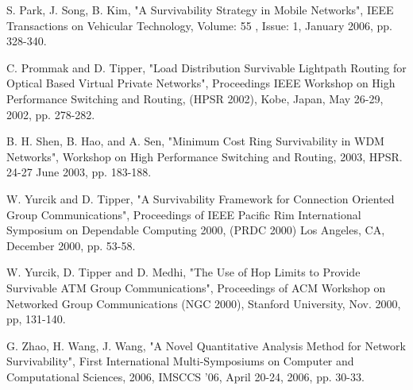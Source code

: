 \documentclass[onecolumn,conference]{IEEEtran}
\begin{document}
\begin{thebibliography}{00}
         S. Park, J. Song, B. Kim, "A Survivability Strategy in Mobile Networks", IEEE Transactions on Vehicular Technology, Volume: 55 , Issue: 1, January 2006, pp. 328-340.

         C. Prommak and D. Tipper, "Load Distribution Survivable Lightpath Routing for Optical Based Virtual Private Networks", Proceedings IEEE Workshop on High Performance Switching and Routing, (HPSR 2002), Kobe, Japan, May 26-29, 2002, pp. 278-282.

         B. H. Shen, B. Hao, and A. Sen, "Minimum Cost Ring Survivability in WDM Networks", Workshop on High Performance Switching and Routing, 2003, HPSR. 24-27 June 2003, pp. 183-188.

         W. Yurcik and D. Tipper, "A Survivability Framework for Connection Oriented Group Communications", Proceedings of IEEE Pacific Rim International Symposium on Dependable Computing 2000, (PRDC 2000) Los Angeles, CA, December 2000, pp. 53-58.

         W. Yurcik, D. Tipper and D. Medhi, "The Use of Hop Limits to Provide Survivable ATM Group Communications", Proceedings of ACM Workshop on Networked Group Communications (NGC 2000), Stanford University, Nov. 2000, pp, 131-140.

         G. Zhao, H. Wang, J. Wang, "A Novel Quantitative Analysis Method for Network Survivability", First International Multi-Symposiums on Computer and Computational Sciences, 2006, IMSCCS '06, April 20-24, 2006, pp. 30-33.

    \end{thebibliography}
\end{document}
